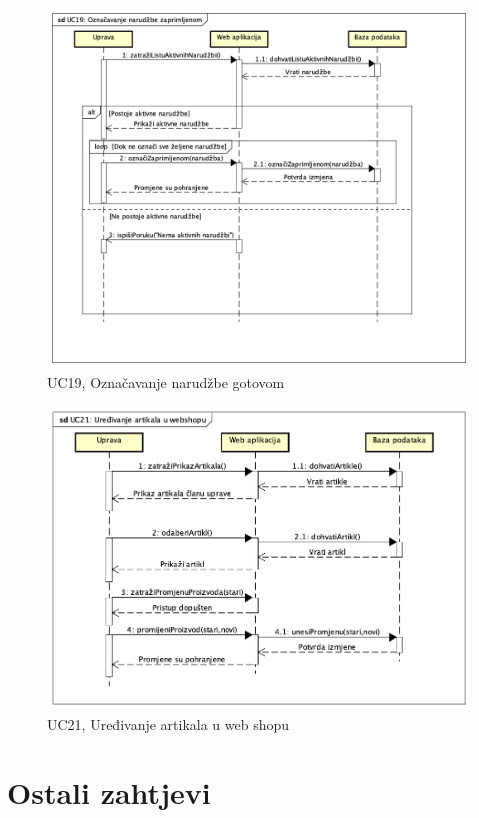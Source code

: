 				\begin{figure}[H]
					\includegraphics[width=\linewidth]{dijagrami/UC19.png}
					\centering
					\caption{UC19, Označavanje narudžbe gotovom}
					\label{fig:SequanceDiagram3}
				\end{figure}
			
				\begin{figure}[H]
					\includegraphics[width=\linewidth]{dijagrami/UC21.png}
					\centering
					\caption{UC21, Uređivanje artikala u web shopu}
					\label{fig:SequanceDiagram4}
				\end{figure}
	
		\section{Ostali zahtjevi}
		
